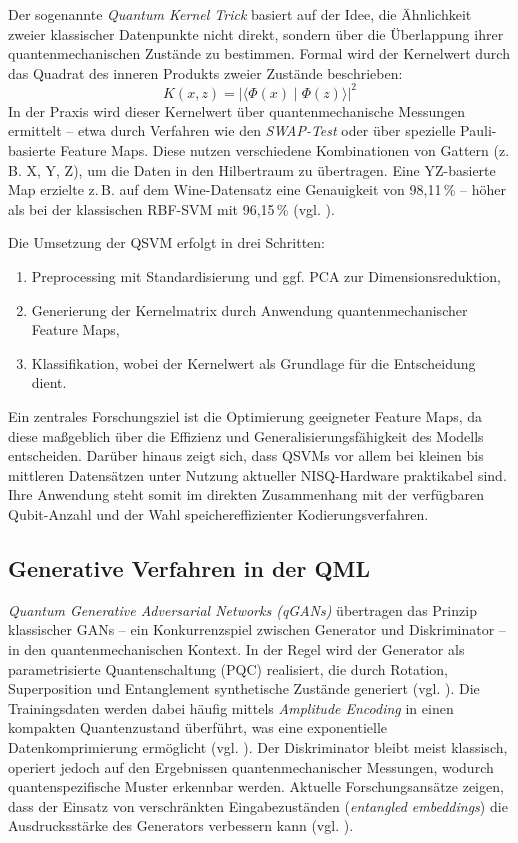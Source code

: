 Der sogenannte \textit{Quantum Kernel Trick} basiert auf der Idee, die Ähnlichkeit zweier klassischer Datenpunkte nicht direkt, sondern über die Überlappung ihrer quantenmechanischen Zustände zu bestimmen. Formal wird der Kernelwert durch das Quadrat des inneren Produkts zweier Zustände beschrieben:
\[
K(x, z) = \left| \langle \Phi(x) \mid \Phi(z) \rangle \right|^2
\]
In der Praxis wird dieser Kernelwert über quantenmechanische Messungen ermittelt – etwa durch Verfahren wie den \textit{SWAP-Test} oder über spezielle Pauli-basierte Feature Maps. Diese nutzen verschiedene Kombinationen von Gattern (z.\,B. X, Y, Z), um die Daten in den Hilbertraum zu übertragen. Eine YZ-basierte Map erzielte z.\,B. auf dem Wine-Datensatz eine Genauigkeit von 98{,}11\,\% – höher als bei der klassischen RBF-SVM mit 96{,}15\,\% (vgl. \cite{kavithaQuantumMachineLearning2024}).

Die Umsetzung der QSVM erfolgt in drei Schritten:
\begin{enumerate}
  \item Preprocessing mit Standardisierung und ggf. PCA zur Dimensionsreduktion,
  \item Generierung der Kernelmatrix durch Anwendung quantenmechanischer Feature Maps,
  \item Klassifikation, wobei der Kernelwert als Grundlage für die Entscheidung dient.
\end{enumerate}

Ein zentrales Forschungsziel ist die Optimierung geeigneter Feature Maps, da diese maßgeblich über die Effizienz und Generalisierungsfähigkeit des Modells entscheiden. Darüber hinaus zeigt sich, dass QSVMs vor allem bei kleinen bis mittleren Datensätzen unter Nutzung aktueller NISQ-Hardware praktikabel sind. Ihre Anwendung steht somit im direkten Zusammenhang mit der verfügbaren Qubit-Anzahl und der Wahl speichereffizienter Kodierungsverfahren.


\subsection{Generative Verfahren in der QML}  
\textit{Quantum Generative Adversarial Networks (qGANs)}  übertragen das Prinzip klassischer GANs – ein Konkurrenzspiel zwischen Generator und Diskriminator – in den quantenmechanischen Kontext. In der Regel wird der Generator als parametrisierte Quantenschaltung (PQC) realisiert, die durch Rotation, Superposition und Entanglement synthetische Zustände generiert (vgl. \cite{zoufal_quantum_2019}). Die Trainingsdaten werden dabei häufig mittels \textit{Amplitude Encoding} in einen kompakten Quantenzustand überführt, was eine exponentielle Datenkomprimierung ermöglicht (vgl. \cite{schuld_supervised_2018}). Der Diskriminator bleibt meist klassisch, operiert jedoch auf den Ergebnissen quantenmechanischer Messungen, wodurch quantenspezifische Muster erkennbar werden. Aktuelle Forschungsansätze zeigen, dass der Einsatz von verschränkten Eingabezuständen (\textit{entangled embeddings}) die Ausdrucksstärke des Generators verbessern kann (vgl. \cite{niu_entangling_2022}).
\vspace{0.3cm}

